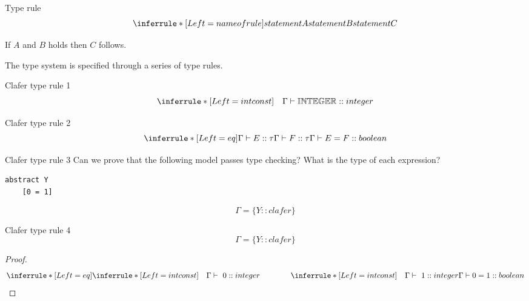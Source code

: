 \documentclass[table,15pt,t]{beamer}
\begin{document}
\begin{frame}[fragile,c]{Type rule}
\begin{equation*}
\inferrule* [Left=name of rule] {statement A \\ statement B} {statement C}
\end{equation*}

\vfill If $A$ and $B$ holds then $C$ follows.

\vfill The type system is specified through a series of type rules.
\end{frame}

\begin{frame}[fragile,c]{Clafer type rule 1}
\begin{equation*}
\inferrule* [Left=intconst] {\quad}{\Gamma\vdash\mathbb{INTEGER}::integer}
\end{equation*}
\end{frame}

\begin{frame}[fragile,c]{Clafer type rule 2}
\begin{equation*}
\inferrule* [Left=eq] {\Gamma\vdash E::\tau \\ \Gamma\vdash F::\tau}{\Gamma\vdash E = F::boolean}
\end{equation*}
\end{frame}

\begin{frame}[fragile,c]{Clafer type rule 3}
Can we prove that the following model passes type checking?
What is the type of each expression?

\begin{lstlisting}
abstract Y
    [0 = 1]
\end{lstlisting}

\begin{equation*}
\Gamma = \{Y::clafer\}
\end{equation*}
\end{frame}

\begin{frame}[fragile,c]{Clafer type rule 4}
\begin{equation*}
\Gamma = \{Y::clafer\}
\end{equation*}

\begin{proof}
\begin{equation*}
\inferrule* [Left=eq] {
  \inferrule* [Left=intconst]{\quad}{\Gamma\vdash\ 0::integer} \\ \hspace{40pt} 
  \inferrule* [Left=intconst]{\quad}{\Gamma\vdash\ 1::integer}}
{\Gamma\vdash 0 = 1::boolean}
\end{equation*}
\end{proof}
\end{frame}
\end{document}
